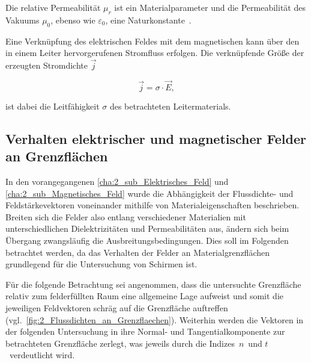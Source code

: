 Die relative Permeabilität $\mu_r$ ist ein Materialparameter und die Permeabilität des Vakuums $\mu_0$, ebenso wie $\varepsilon_0$, eine Naturkonstante~\cite{EM_Schirmung}.
\par
\vspace{\linespace}
Eine Verknüpfung des elektrischen Feldes mit dem magnetischen kann über den in einem Leiter hervorgerufenen Stromfluss erfolgen. Die verknüpfende Größe der erzeugten Stromdichte $\vec j$

\begin{equation}
    \vec j = \sigma \cdot \vec E,
\end{equation}

ist dabei die Leitfähigkeit $\sigma$ des betrachteten Leitermaterials.


\subsection{Verhalten elektrischer und magnetischer Felder an Grenzflächen}\label{cha:2_sub_Verhalten_an_Grenzflächen}

In den vorangegangenen \Abschnitten \ref{cha:2_sub_Elektrisches_Feld} und \ref{cha:2_sub_Magnetisches_Feld} wurde die Abhängigkeit der Flussdichte- und Feldstärkevektoren voneinander mithilfe von Materialeigenschaften beschrieben. Breiten sich die Felder also entlang verschiedener Materialien mit unterschiedlichen Dielektrizitäten und Permeabilitäten aus, ändern sich beim Übergang zwangsläufig die Ausbreitungsbedingungen. Dies soll im Folgenden betrachtet werden, da das Verhalten der Felder an Materialgrenzflächen grundlegend für die Untersuchung von Schirmen ist. 
\par
\vspace{\linespace}
Für die folgende Betrachtung sei angenommen, dass die untersuchte Grenzfläche relativ zum felderfüllten Raum eine allgemeine Lage aufweist und somit die jeweiligen Feldvektoren schräg auf die \mbox{Grenzfläche} auftreffen (vgl.~\Abb\ref{fig:2_Flussdichten_an_Grenzflaechen}). Weiterhin werden die Vektoren in der folgenden Untersuchung in ihre Normal- und Tangentialkomponente zur betrachteten Grenzfläche zerlegt, was jeweils durch die Indizes~\glqq$n$\grqq~und \glqq$t$\grqq~verdeutlicht wird. 
\par
\vspace{\linespace}

